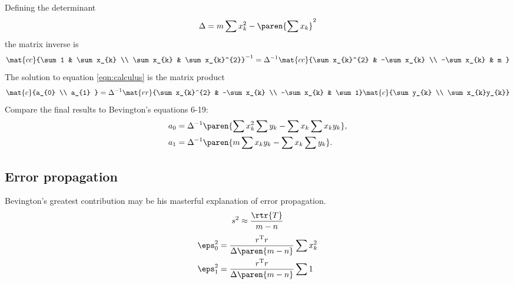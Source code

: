 Defining the determinant
  \begin{equation*}   %
    \Delta = m \sum x_{k}^{2} - \paren{\sum x_{k}}^{2}
  \end{equation*}
the matrix inverse is
  \begin{equation*}   %
    \mat{cc}{\sum 1 & \sum x_{k} \\ \sum x_{k} & \sum x_{k}^{2}}^{-1} = \Delta^{-1} 
    \mat{cc}{\sum x_{k}^{2} & -\sum x_{k} \\ -\sum x_{k} & m }
  \end{equation*}
The solution to equation \eqref{eqn:calculus} is the matrix product
  \begin{equation}
    \mat{c}{a_{0} \\ a_{1} } = \Delta^{-1}
    \mat{rr}{\sum x_{k}^{2} & -\sum x_{k} \\ -\sum x_{k} & \sum 1}
    \mat{c}{\sum y_{k} \\ \sum x_{k}y_{k}}
    \label{eqn:bevington solution product}
  \end{equation}
Compare the final results to Bevington's equations 6-19:
  \begin{equation}
  \begin{split}
    a_{0} &= \Delta^{-1} \paren{\sum x_{k}^{2}\sum y_{k} - \sum x_{k}\sum x_{k}y_{k}}, \\
    a_{1} &= \Delta^{-1} \paren{m \sum x_{k}y_{k} - \sum x_{k}\sum y_{k}}.
  \label{eqn:bevington soln}
  \end{split}
  \end{equation}

\subsection{Error propagation}
Bevington's greatest contribution may be his masterful explanation of error propagation.
  \begin{equation}
    s^{2} \approx \frac{\rtr{T}} {m-n}
  \end{equation}
\begin{equation}
  \begin{split}
    \eps_{0}^{2} &= \frac{r^{\mathrm{T}}r}{\Delta\paren{m-n}} \sum x_{k}^{2} \\
    \eps_{1}^{2} &= \frac{r^{\mathrm{T}}r}{\Delta\paren{m-n}} \sum 1 \\
  \end{split}
  \label{eqn:bevington error terms}
\end{equation}

